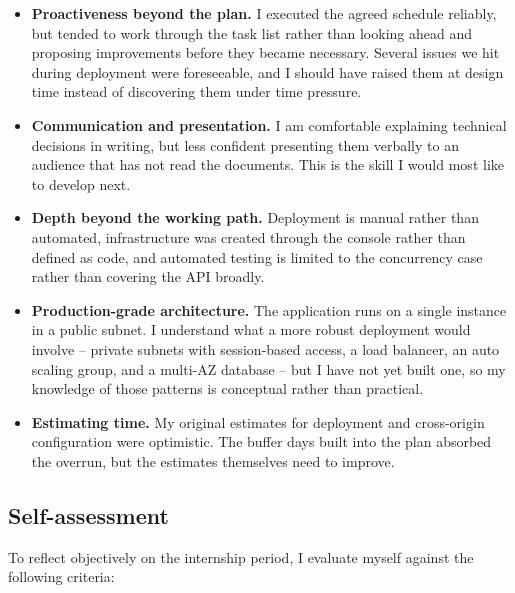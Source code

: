 \begin{itemize}
    \setlength\itemsep{0.2em}
    \item \textbf{Proactiveness beyond the plan.} I executed the agreed schedule
    reliably, but tended to work through the task list rather than looking ahead
    and proposing improvements before they became necessary. Several issues we
    hit during deployment were foreseeable, and I should have raised them at
    design time instead of discovering them under time pressure.

    \item \textbf{Communication and presentation.} I am comfortable explaining
    technical decisions in writing, but less confident presenting them verbally
    to an audience that has not read the documents. This is the skill I would
    most like to develop next.

    \item \textbf{Depth beyond the working path.} Deployment is manual rather
    than automated, infrastructure was created through the console rather than
    defined as code, and automated testing is limited to the concurrency case
    rather than covering the API broadly.

    \item \textbf{Production-grade architecture.} The application runs on a
    single instance in a public subnet. I understand what a more robust
    deployment would involve -- private subnets with session-based access, a
    load balancer, an auto scaling group, and a multi-AZ database -- but I have
    not yet built one, so my knowledge of those patterns is conceptual rather
    than practical.

    \item \textbf{Estimating time.} My original estimates for deployment and
    cross-origin configuration were optimistic. The buffer days built into the
    plan absorbed the overrun, but the estimates themselves need to improve.
\end{itemize}

\subsection{Self-assessment}

To reflect objectively on the internship period, I evaluate myself against the
following criteria:

